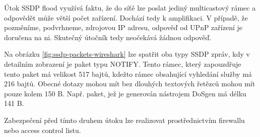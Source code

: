 Útok SSDP flood využívá faktu, že do síťě lze poslat jediný multicastový rámec a odpovědět může větší počet zařízení. Dochází tedy k amplifikaci. V případě, že pozměníme, podvrhneme, zdrojovou IP adresu, odpověď od UPnP zařízení je doručena na ni. Skutečný útočník tedy neočekává žádnou odpověď. 

Na obrázku \ref{fig:ssdp-packets-wireshark} lze spatřit oba typy SSDP zpráv, kdy v detailním zobrazení je paket typu NOTIFY. Tento rámec, který zapouzdřuje tento paket má velikost 517 bajtů, kdežto rámec obsahující vyhledání služby má 216 bajtů. Obecné dotazy mohou mít bez dlouhých textových řetězců mohou mít pouze kolem 150 B. Např. paket, jež je generován nástrojem DoSgen má délku 141 B.

Zabezpečení před tímto druhem útoku lze realizovat prostřednictvím firewallu nebo access control listu.
